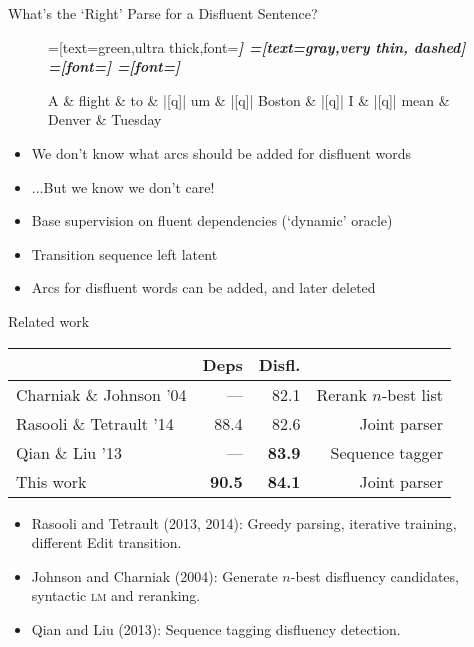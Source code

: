 \documentclass[color=usenames,dvipsnames]{lecture}
\begin{document}
\begin{plain}{What's the `Right' Parse for a Disfluent Sentence?}

\begin{figure}
    \centering
    \begin{dependency}[theme=simple]
    =[text=green,ultra thick,font=\bfseries\itshape]
    =[text=gray,very thin, dashed]
    =[font=\bfseries\itshape]
    =[font=\itshape]
    \begin{deptext}[column sep=.075cm, row sep=.1ex]
        A \& flight \& to \& |[q]| um \& |[q]| Boston \& |[q]| I \& |[q]| mean \& Denver \& Tuesday \\
    \end{deptext}
\end{dependency}
\end{figure}

\begin{itemize}

\item We don't know what arcs should be added for disfluent words
\item ...But we know we don't care!
\item Base supervision on fluent dependencies (`dynamic' oracle)
\item Transition sequence left latent
\item Arcs for disfluent words can be added, and later deleted
\end{itemize}
\end{plain}

\begin{plain}{Related work}

\begin{center}
\begin{tabular}{l|rr|r}
\hline
     & Deps  & Disfl. \\
     \hline \hline
Charniak \& Johnson '04 &  ---         & 82.1 & Rerank $n$-best list\\
Rasooli \& Tetrault '14 &  88.4        & 82.6 & Joint parser \\
Qian \& Liu '13         &  ---         & \textbf{83.9} & Sequence tagger \\
This work               &\textbf{90.5} & \textbf{84.1} & Joint parser \\
\hline
\end{tabular}
\end{center}

\begin{itemize}
\item Rasooli and Tetrault (2013, 2014): Greedy parsing, iterative training,
      different Edit transition.
\item Johnson and Charniak (2004): Generate $n$-best disfluency candidates,
   syntactic \textsc{lm} and reranking.
\item Qian and Liu (2013): Sequence tagging disfluency detection.
\end{itemize}
\end{plain}
\end{document}
